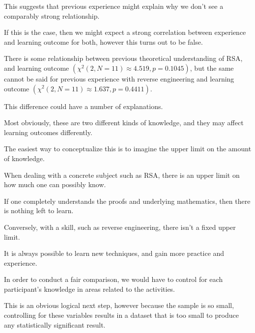         This suggests that previous experience might explain why we don't see a comparably strong relationship. %



If this is the case, then we might expect a strong correlation between experience and learning outcome for both, however this turns out to be false. %



There is some relationship between previous theoretical understanding of RSA, and learning outcome $(\chi^2(2, N=11)\approx4.519,  p = 0.1045)$, but the same cannot be said for previous experience with reverse engineering and learning outcome $(\chi^2(2, N=11)\approx1.637,  p = 0.4411)$. %



This difference could have a number of explanations. %



Most obviously, these are two different kinds of knowledge, and they may affect learning outcomes differently. %



The easiest way to conceptualize this is to imagine the upper limit on the amount of knowledge. %



When dealing with a concrete subject such as RSA, there is an upper limit on how much one can possibly know. %



If one completely understands the proofs and underlying mathematics, then there is nothing left to learn. %



Conversely, with a skill, such as reverse engineering, there isn't a fixed upper limit. %



It is always possible to learn new techniques, and gain more practice and experience. 







        In order to conduct a fair comparison, we would have to control for each participant's knowledge in areas related to the activities. %



This is an obvious logical next step, however because the sample is so small, controlling for these variables results in a dataset that is too small to produce any statistically significant result. %



